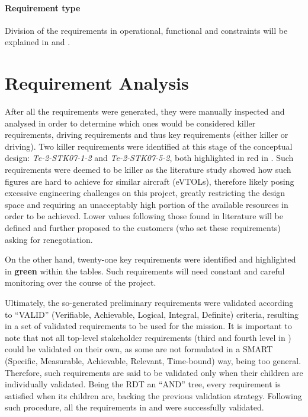 \paragraph{Requirement type}Division of the requirements in operational, functional and constraints will be explained in  and .

\section{Requirement Analysis}
\label{sec:reqanalysissetup}
After all the requirements were generated, they were manually inspected and analysed in order to determine which ones would be considered killer requirements, driving requirements and thus key requirements (either killer or driving).
Two killer requirements were identified at this stage of the conceptual design: \textit{Te-2-STK07-1-2} and \textit{Te-2-STK07-5-2}, both highlighted in red in .
Such requirements were deemed to be killer as the literature study showed how such figures are hard to achieve for similar aircraft (eVTOLs), therefore likely posing excessive engineering challenges on this project, greatly restricting the design space and requiring an unacceptably high portion of the available resources in order to be achieved.
Lower values following those found in literature will be defined and further proposed to the customers (who set these requirements) asking for renegotiation.

On the other hand, twenty-one key requirements were identified and highlighted in \textbf{green} within the tables.
Such requirements will need constant and careful monitoring over the course of the project.

Ultimately, the so-generated preliminary requirements were validated according to \enquote{VALID} (Verifiable, Achievable, Logical, Integral, Definite) criteria, resulting in a set of validated requirements to be used for the mission. 
It is important to note that not all top-level stakeholder requirements (third and fourth level in ) could be validated on their own, as some are not formulated in a SMART (Specific, Measurable, Achievable, Relevant, Time-bound) way, being too general.
Therefore, such requirements are said to be validated only when their children are individually validated.
Being the RDT an \enquote{AND} tree, every requirement is satisfied when its children are, backing the previous validation strategy.
Following such procedure, all the requirements in  and  were successfully validated.

